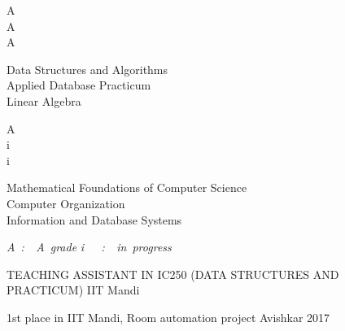 \documentclass[]{awesome-cv}
\begin{document}
\vspace{-3mm}

\vspace{-5mm}
\begin{cvhonors}
	\begin{minipage}[t]{0.05\textwidth}
		A\\
		A\\
		A
	\end{minipage}\begin{minipage}[t]{0.45\textwidth}
		 Data Structures and Algorithms\\	
		 Applied Database Practicum\\	
		 Linear Algebra	
	\end{minipage}\begin{minipage}[t]{0.05\textwidth}
		A\\
		i\\
		i
	\end{minipage}\begin{minipage}[t]{0.45\textwidth}
		Mathematical Foundations of Computer Science\\
		Computer Organization\\	
		Information and Database Systems\\	
	\end{minipage}	

\color[HTML]{b30000}
\textit{A~:~~A~grade }
\textit{i~~~:~~in~progress}  
	
\end{cvhonors}




\vspace{-5mm}
\begin{cventries}
	\cventry
	{TEACHING ASSISTANT IN IC250 (DATA STRUCTURES AND PRACTICUM)}
	{IIT Mandi}
	{}
	{}
	{}	
\end{cventries}
\vspace{-5mm}
\begin{cventries}
	\cventry
	{1st place in IIT Mandi, Room automation project}
	{Avishkar 2017}
	{}
	{}
	{}	
\end{cventries}


\ 
\end{document}
